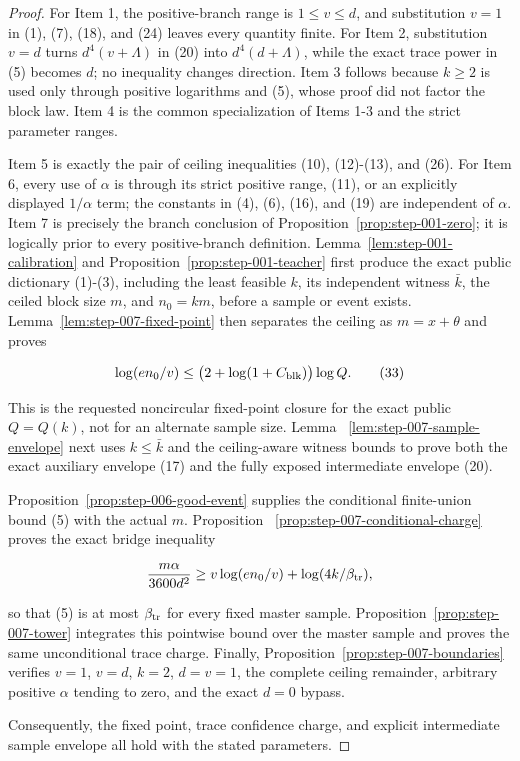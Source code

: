 \begin{proof}
For Item 1, the  positive-branch range is
\(1\le v\le d\), and substitution \(v=1\) in (1), (7), (18), and (24)
leaves every quantity finite. For Item 2, substitution \(v=d\) turns
\(d^4(v+\Lambda)\) in (20) into \(d^4(d+\Lambda)\), while the exact trace
power in (5) becomes \(d\); no inequality changes direction. Item 3 follows
because \(k\ge2\) is used only through positive logarithms and 
(5), whose proof did not factor the block law. Item 4 is the common
specialization of Items 1-3 and the strict parameter ranges.

Item 5 is exactly the pair of ceiling inequalities (10), (12)-(13), and
(26). For Item 6, every use of \(\alpha\) is through its strict positive
range, (11), or an explicitly displayed \(1/\alpha\) term; the constants in
(4), (6), (16), and (19) are independent of \(\alpha\). Item 7 is precisely
the branch conclusion of Proposition~\ref{prop:step-001-zero}; it is logically prior to every
positive-branch definition. 
Lemma~\ref{lem:step-001-calibration} and Proposition~\ref{prop:step-001-teacher} first produce the exact public
dictionary (1)-(3), including the least feasible \(k\), its independent
witness \(\bar k\), the ceiled block size \(m\), and \(n_0=km\), before a
sample or event exists. Lemma~\ref{lem:step-007-fixed-point} then separates
the ceiling as \(m=x+\theta\) and proves

\[
 \log(en_0/v)
 \le\bigl(2+\log(1+C_{\rm blk})\bigr)\log Q.
\tag{33}
\]

This is the requested noncircular fixed-point closure for the exact public
\(Q=Q(k)\), not for an alternate sample size. Lemma
~\ref{lem:step-007-sample-envelope} next uses \(k\le\bar k\) and the
 ceiling-aware witness bounds to prove both the exact auxiliary
envelope (17) and the fully exposed intermediate envelope (20).

Proposition~\ref{prop:step-006-good-event} supplies the conditional
finite-union bound (5) with the actual \(m\). Proposition
~\ref{prop:step-007-conditional-charge} proves the exact bridge inequality

\[
 \frac{m\alpha}{3600d^2}
 \ge v\log(en_0/v)+\log(4k/\beta_{\rm tr}),
\]

so that (5) is at most \(\beta_{\rm tr}\) for every fixed master sample.
Proposition~\ref{prop:step-007-tower} integrates this pointwise bound over
the master sample and proves the same unconditional trace charge. Finally,
Proposition~\ref{prop:step-007-boundaries} verifies \(v=1\), \(v=d\),
\(k=2\), \(d=v=1\), the complete ceiling remainder, arbitrary positive
\(\alpha\) tending to zero, and the exact \(d=0\) bypass.

Consequently, the fixed point, trace confidence charge, and explicit
intermediate sample envelope all hold with the stated parameters.



\end{proof}

